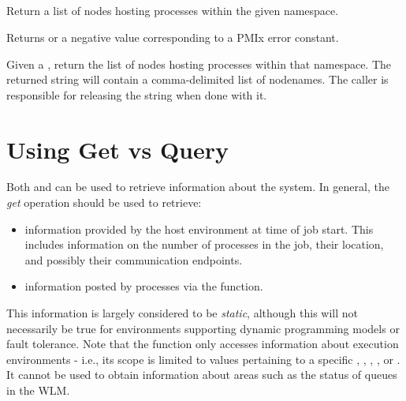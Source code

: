 \subsection{}

\summary

Return a list of nodes hosting processes within the given namespace.

\format


\begin{arglist}
\end{arglist}

Returns  or a negative value corresponding to a PMIx error constant.

\descr

Given a , return the list of nodes hosting processes within that namespace.
The returned string will contain a comma-delimited list of nodenames.
The caller is responsible for releasing the string when done with it.



\section{Using Get vs Query}
\label{chap:api_job_mgmt:query}

Both  and  can be used to retrieve information about the system. In general, the \emph{get} operation should be used to retrieve:

\begin{itemize}
\item information provided by the host environment at time of job start. This includes information on the number of processes in the job, their location, and possibly their communication endpoints.
\item information posted by processes via the  function.
\end{itemize}

This information is largely considered to be \emph{static}, although this will not necessarily be true for environments supporting dynamic programming models or fault tolerance. Note that the  function only accesses information about execution environments - i.e., its scope is limited to values pertaining to a specific , , , , or . It cannot be used to obtain information about areas such as the status of queues in the \ac{WLM}.

